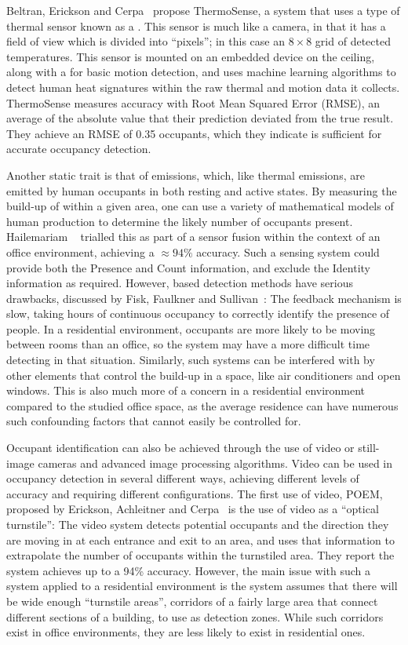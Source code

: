 \documentclass[../thesis/thesis.tex]{subfiles}
\begin{document}
Beltran, Erickson and Cerpa~\cite{beltran2013thermosense} propose ThermoSense, a system that uses a type of thermal sensor known as a \iar. This sensor is much like a camera, in that it has a field of view which is divided into ``pixels''; in this case an $8\times8$ grid of detected temperatures. This sensor is mounted on an embedded device on the ceiling, along with a \pir for basic motion detection, and uses machine learning algorithms to detect human heat signatures within the raw thermal and motion data it collects. ThermoSense measures accuracy with Root Mean Squared Error (RMSE), an average of the absolute value that their prediction deviated from the true result. They achieve an RMSE of 0.35 occupants, which they indicate is sufficient for accurate occupancy detection.

Another static trait is that of \cdi emissions, which, like thermal emissions, are emitted by human occupants in both resting and active states. By measuring the build-up of \cdi within a given area, one can use a variety of mathematical models of human \cdi production to determine the likely number of occupants present. Hailemariam \etal~\cite{hailemariam2011real} trialled this as part of a sensor fusion within the context of an office environment, achieving a $\approx94\%$ accuracy. Such a sensing system could provide both the Presence and Count information, and exclude the Identity information as required. However, \cdi based detection methods have serious drawbacks, discussed by Fisk, Faulkner and Sullivan~\cite{fisk2006accuracy}: The \cdi feedback mechanism is slow, taking hours of continuous occupancy to correctly identify the presence of people. In a residential environment, occupants are more likely to be moving between rooms than an office, so the system may have a more difficult time detecting in that situation. Similarly, such systems can be interfered with by other elements that control the \cdi build-up in a space, like air conditioners and open windows. This is also much more of a concern in a residential environment compared to the studied office space, as the average residence can have numerous such confounding factors that cannot easily be controlled for.

Occupant identification can also be achieved through the use of video or still-image cameras and advanced image processing algorithms. Video can be used in occupancy detection in several different ways, achieving different levels of accuracy and requiring different configurations. The first use of video, POEM, proposed by Erickson, Achleitner and Cerpa~\cite{erickson2013poem} is the use of video as a ``optical turnstile'': The video system detects potential occupants and the direction they are moving in at each entrance and exit to an area, and uses that information to extrapolate the number of occupants within the turnstiled area. They report the system achieves up to a 94\% accuracy. However, the main issue with such a system applied to a residential environment is the system assumes that there will be wide enough ``turnstile areas'', corridors of a fairly large area that connect different sections of a building, to use as detection zones. While such corridors exist in office environments, they are less likely to exist in residential ones.
\end{document}

